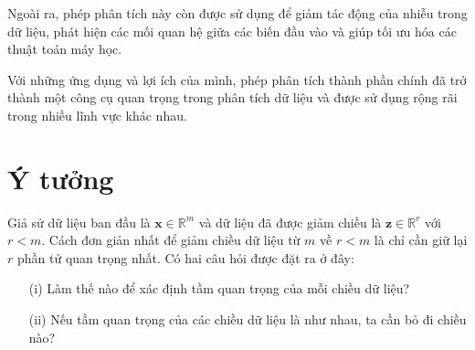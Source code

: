\documentclass[12pt,a4paper,oneside]{report}
\numberwithin{equation}{section}
\begin{document}
Ngoài ra, phép phân tích này còn được sử dụng để giảm tác động của nhiễu trong dữ liệu, phát hiện các mối quan hệ giữa các biến đầu vào và giúp tối ưu hóa các thuật toán máy học.

Với những ứng dụng và lợi ích của mình, phép phân tích thành phần chính đã trở thành một công cụ quan trọng trong phân tích dữ liệu và được sử dụng rộng rãi trong nhiều lĩnh vực khác nhau.
\section{Ý tưởng}
Giả sử dữ liệu ban đầu là $\mathbf{x} \in \mathbb{R}^{m}$ và dữ liệu đã được giảm chiều là $\mathbf{z} \in \mathbb{R}^{r}$ với $r<m$. Cách đơn giản nhất để giảm chiều dữ liệu từ $m$ về $r<m$ là chỉ cần giữ lại $r$ phần tử quan trọng nhất. Có hai câu hỏi được đặt ra ở đây:
\begin{itemize}

\item[(i)] Làm thế nào để xác định tầm quan trọng của mỗi chiều dữ liệu?
\item[(ii)] Nếu tầm quan trọng của các chiều dữ liệu là như nhau, ta cần bỏ đi chiều nào?
	
\end{itemize}
\end{document}
